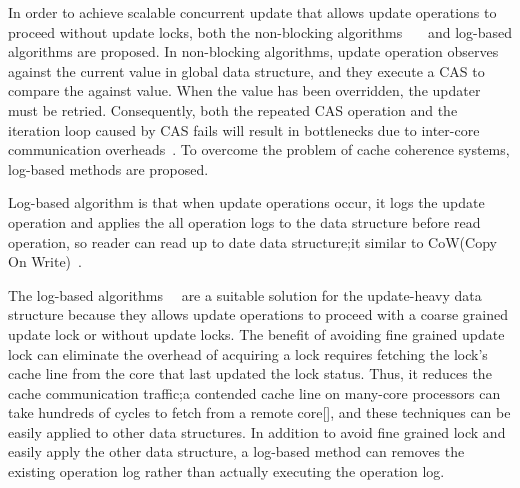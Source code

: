 
In order to achieve scalable concurrent update that allows update operations
to proceed without update locks, both the non-blocking
algorithms~\cite{Harris2001Lockfree}~\cite{Fomitchev2004Lockfree}~\cite{Timnat2012}
and log-based algorithms are proposed.
In non-blocking algorithms, update operation observes against the current
value in global data structure, and they execute a CAS to compare the against
value.
When the value has been overridden, the updater must be retried.
Consequently, both the repeated CAS operation and the iteration loop caused
by CAS fails will result in bottlenecks due to inter-core communication
overheads~\cite{SilasBoydWickizerPth}.
To overcome the problem of cache coherence systems, log-based methods are
proposed.


Log-based algorithm is that when update operations occur, it logs the update
operation and applies the all operation logs to the data structure
before read operation, so reader can read up to date data structure;it similar
to CoW(Copy On Write)~\cite{PaulDetailLWN}.

The log-based algorithms~\cite{Hendler2010FC}~\cite{SilasBoydWickizerPth} are
a suitable solution for the update-heavy data structure because they allows
update operations to proceed with a coarse grained update lock or without
update locks.
The benefit of avoiding fine grained update lock can eliminate the overhead of
acquiring a lock requires fetching the lock's cache line from the core that
last updated the lock status.
Thus, it reduces the cache communication traffic;a contended cache line on
many-core processors can take hundreds of cycles to fetch from a remote
core[], and these techniques can be easily applied to other data structures.
In addition to avoid fine grained lock and easily apply the
other data structure, a log-based method can removes the existing
operation log rather than actually executing the operation log.

